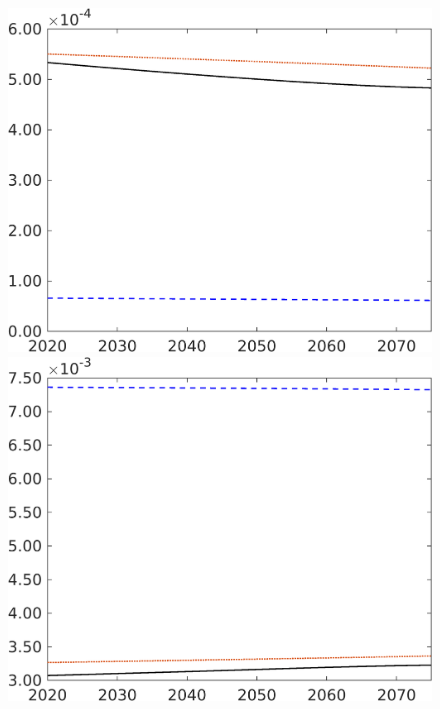 \begin{figure}[h!!]
\begin{minipage}[]{0.32\textwidth}
	\end{minipage}
	\begin{minipage}[]{0.32\textwidth}
		\includegraphics[width=1\textwidth]{../../codding_model/own_basedOnFried/optimalPol_elastS_DisuSci/figures/all_1705/Extern_CompEff_Lf_spillover0_noskill0_sep1_BN0_ineq0_red0_etaa0.79_lgd0.png}
	\end{minipage}
	\begin{minipage}[]{0.32\textwidth}
		\includegraphics[width=1\textwidth]{../../codding_model/own_basedOnFried/optimalPol_elastS_DisuSci/figures/all_1705/Extern_CompEff_Lg_spillover0_noskill0_sep1_BN0_ineq0_red0_etaa0.79_lgd0.png}

\end{minipage}
\end{figure}
